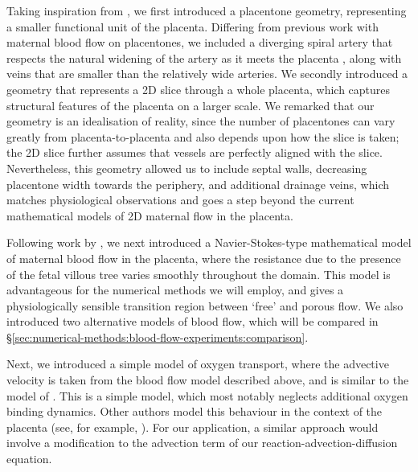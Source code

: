         Taking inspiration from \citeauthor{lecarpentierComputationalFluidDynamic2016} \cite{lecarpentierComputationalFluidDynamic2016}, we first introduced a placentone geometry, representing a smaller functional unit of the placenta. Differing from previous work with maternal blood flow on placentones, we included a diverging spiral artery that respects the natural widening of the artery as it meets the placenta \cite{burtonRheologicalPhysiologicalConsequences2009}, along with veins that are smaller than the relatively wide arteries. We secondly introduced a geometry that represents a 2D slice through a whole placenta, which captures structural features of the placenta on a larger scale. We remarked that our geometry is an idealisation of reality, since the number of placentones can vary greatly from placenta-to-placenta and also depends upon how the slice is taken; the 2D slice further assumes that vessels are perfectly aligned with the slice. Nevertheless, this geometry allowed us to include septal walls, decreasing placentone width towards the periphery, and additional drainage veins, which matches physiological observations and goes a step beyond the current mathematical models of 2D maternal flow in the placenta.

        Following work by \citeauthor{meklerImpactTissuePorosity2022} \cite{meklerImpactTissuePorosity2022}, we next introduced a Navier-Stokes-type mathematical model of maternal blood flow in the placenta, where the resistance due to the presence of the fetal villous tree varies smoothly throughout the domain. This model is advantageous for the numerical methods we will employ, and gives a physiologically sensible transition region between `free' and porous flow. We also introduced two alternative models of blood flow, which will be compared in \S\ref{sec:numerical-methods:blood-flow-experiments:comparison}.

        Next, we introduced a simple model of oxygen transport, where the advective velocity is taken from the blood flow model described above, and is similar to the model of \citeauthor{chernyavskyMathematicalModelIntervillous2010} \cite{chernyavskyMathematicalModelIntervillous2010}. This is a simple model, which most notably neglects additional oxygen binding dynamics. Other authors model this behaviour in the context of the placenta (see, for example, \cite{pearceImageBasedModelingBlood2016,serovOptimalVilliDensity2015,meklerImpactTissuePorosity2022}). For our application, a similar approach would involve a modification to the advection term of our reaction-advection-diffusion equation.

